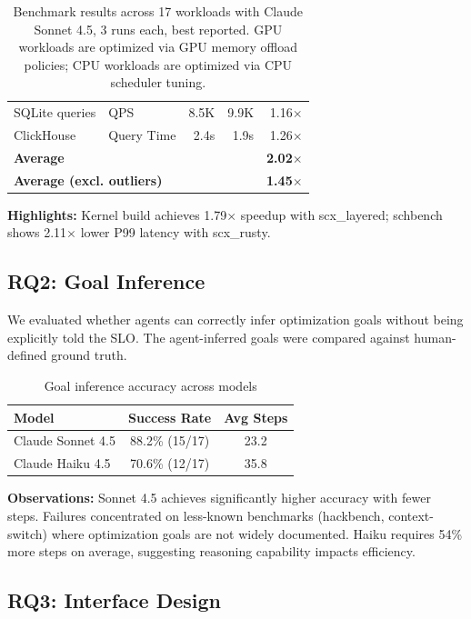 \documentclass{article}
\begin{document}
\begin{table}[h]
\begin{tabular}{llrrr}
SQLite queries & QPS & 8.5K & 9.9K & 1.16$\times$ \\
ClickHouse & Query Time & 2.4s & 1.9s & 1.26$\times$ \\
\midrule
\multicolumn{2}{l}{\textbf{Average}} & & & \textbf{2.02$\times$} \\
\multicolumn{2}{l}{\textbf{Average (excl. outliers)}} & & & \textbf{1.45$\times$} \\
\bottomrule
\end{tabular}
\caption{Benchmark results across 17 workloads with Claude Sonnet 4.5, 3 runs each, best reported. GPU workloads are optimized via GPU memory offload policies; CPU workloads are optimized via CPU scheduler tuning.}
\label{tab:results}
\end{table}

\textbf{Highlights:} Kernel build achieves 1.79$\times$ speedup with scx\_layered; schbench shows 2.11$\times$ lower P99 latency with scx\_rusty.

\subsection{RQ2: Goal Inference}

We evaluated whether agents can correctly infer optimization goals without being explicitly told the SLO. The agent-inferred goals were compared against human-defined ground truth.

\begin{table}[h]
\centering
\begin{tabular}{lcc}
\toprule
\textbf{Model} & \textbf{Success Rate} & \textbf{Avg Steps} \\
\midrule
Claude Sonnet 4.5 & 88.2\% (15/17) & 23.2 \\
Claude Haiku 4.5 & 70.6\% (12/17) & 35.8 \\
\bottomrule
\end{tabular}
\caption{Goal inference accuracy across models}
\label{tab:goal-inference}
\end{table}

\textbf{Observations:} Sonnet 4.5 achieves significantly higher accuracy with fewer steps. Failures concentrated on less-known benchmarks (hackbench, context-switch) where optimization goals are not widely documented. Haiku requires 54\% more steps on average, suggesting reasoning capability impacts efficiency.

\subsection{RQ3: Interface Design}
\end{document}
